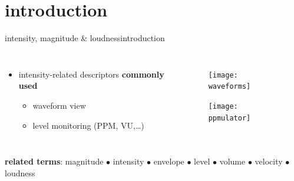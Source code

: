    \section[intro]{introduction}
        \begin{frame}{intensity, magnitude \& loudness}{introduction}
            \begin{columns}
                \begin{itemize}
                    \item   intensity-related descriptors \textbf{commonly used}
                        \begin{itemize}
                            \item	waveform view
                            
                            \item	level monitoring (PPM, VU,\ldots)
                            
                         \end{itemize}
                \end{itemize}
                \begin{figure}%
                    \texttt{[image: waveforms]}%

                    \vspace{8mm}
                    \texttt{[image: ppmulator]}%
                \end{figure}
            \end{columns}
            \pause
            \bigskip
            \bigskip
            \bigskip
            \textbf{related terms}: magnitude $\bullet$ intensity $\bullet$ envelope $\bullet$ level $\bullet$ volume $\bullet$ velocity $\bullet$ loudness
            
        \end{frame}

